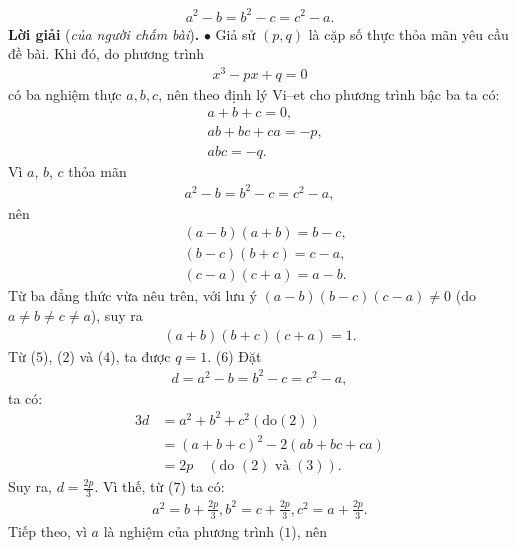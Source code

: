 \begin{multicols}{2}
	\begin{align*}
		a^2-b=b^2-c=c^2-a.
	\end{align*}
	\textbf{\color{thachthuctoanhoc}Lời giải} (\textit{của người chấm bài})\textbf{\color{thachthuctoanhoc}.}
	\vskip 0.05cm
	$\bullet$ Giả sử $(p, q)$ là cặp số thực thỏa mãn yêu cầu đề bài.
	\vskip 0.05cm
	Khi đó, do phương trình
	\begin{align*}
		{x^3} - px + q = 0 \tag{$1$}
	\end{align*}
	có ba nghiệm thực $a, b, c$, nên theo định lý Vi--et cho phương trình bậc ba ta có:
	\begin{align*}
		&a + b + c = 0, \tag{$2$}\\
		&ab + bc + ca = -p,  \tag{$3$}\\
		&abc = -q. \tag{$4$}  
	\end{align*}
	Vì $a$, $b$, $c$ thỏa mãn
	\begin{align*}
		{a^2} - b = {b^2} - c = {c^2} - a,
	\end{align*}
	nên
	\begin{align*}
		&\left( {a - b} \right)\left( {a + b} \right) = b - c,\\
		&\left( {b - c} \right)\left( {b + c} \right) = c - a,\\
		&\left( {c - a} \right)\left( {c + a} \right) = a - b.
	\end{align*}
	Từ ba đẳng thức vừa nêu trên, với lưu ý $(a - b)(b - c)(c - a) \ne 0$ (do $a \ne b \ne c \ne a$), suy ra
    \begin{align*}
    		(a + b)(b + c)(c + a) = 1.
    \end{align*}
	Từ ($5$), ($2$) và ($4$), ta được $q = 1$. \hfill ($6$)
	Đặt
	\begin{align*}
		d = {a^2} - b = {b^2} - c = {c^2} - a, \tag{$7$}
	\end{align*}
	ta có:
	\begin{align*}
			3d &= {a^2} + {b^2} + {c^2}({\text{do}}(2))\\
			 &= {\left( {a + b + c} \right)^2} - 2\left( {ab + bc + ca} \right)\\
			 &= 2p \quad({\text{do }}(2){\text{ và }}(3)).
	\end{align*}
	Suy ra, $d = \frac{{2p}}{3}$. Vì thế, từ ($7$) ta có:
	\begin{align*}
		{a^2} = b + \frac{{2p}}{3}, {b^2} = c + \frac{{2p}}{3}, {c^2} = a + \frac{{2p}}{3}.
	\end{align*}
	Tiếp theo, vì $a$ là nghiệm của phương trình ($1$), nên
	\begin{align*}

\end{align*}
\end{multicols}
